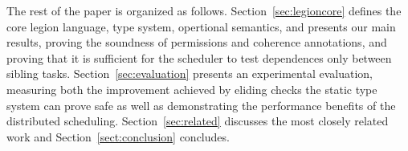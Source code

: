 The rest of the paper is organized as follows.  Section~\ref{sec:legioncore} defines the core legion language, type system,
opertional semantics, and presents our main results, proving the soundness of permissions and coherence annotations, and proving
that it is sufficient for the scheduler to test dependences only between sibling tasks.  Section~\ref{sec:evaluation} presents an experimental evaluation, measuring both the improvement achieved by eliding checks the static type system can prove safe as well as demonstrating the performance benefits of the distributed scheduling.  Section~\ref{sec:related} discusses the most closely related work and Section~\ref{sect:conclusion} concludes.










